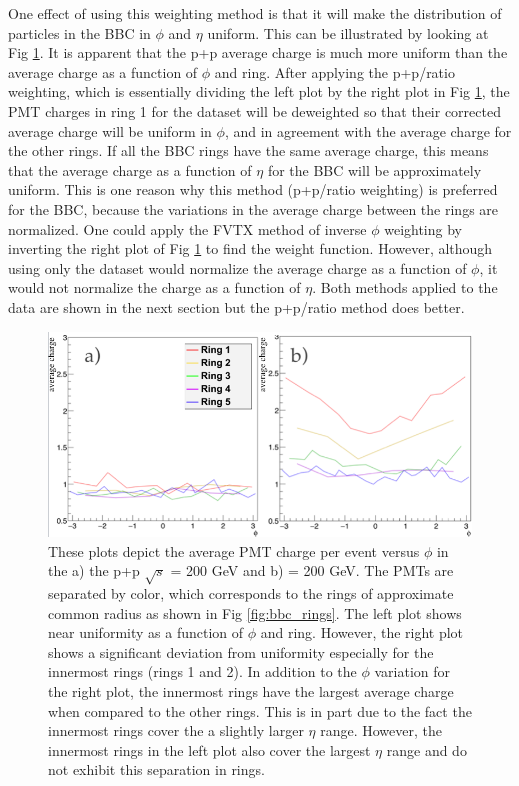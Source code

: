 One effect of using this weighting method is that it will make the distribution of particles in the BBC in $\phi$ and $\eta $ uniform. This can be illustrated by looking at Fig \ref{fig:bbc_pmt_phi_pp_pau}. It is apparent that the p+p average charge is much more uniform than the \pau average charge as a function of $\phi$ and ring. After applying the p+p/\pau ratio weighting, which is essentially dividing the left plot by the right plot in Fig \ref{fig:bbc_pmt_phi_pp_pau}, the PMT charges in ring 1 for the \pau dataset will be deweighted so that their corrected average charge will be uniform in $\phi$, and in agreement with the average charge for the other rings. If all the BBC rings have the same average charge, this means that the average charge as a function of $\eta$ for the BBC will be approximately uniform. This is one reason why this method (p+p/\pau ratio weighting) is preferred for the BBC, because the variations in the average charge between the rings are normalized. One could apply the FVTX method of inverse $\phi$ weighting by inverting the right plot of Fig \ref{fig:bbc_pmt_phi_pp_pau} to find the weight function. However, although using only the \pau dataset would normalize the average charge as a function of $\phi$, it would not normalize the charge as a function of $\eta$. Both methods applied to the data are shown in the next section but the p+p/\pau ratio method does better.

\begin{figure}[h!]
\begin{center}
\includegraphics[width=0.75\linewidth]{figs/pp_pau_bbc_comparison.png}
\caption{These plots depict the average PMT charge per event versus $\phi$ in the a) the p+p $\sqrt{s}$ = 200 GeV and b) \pau \sqsn = 200 GeV. The PMTs are separated by color, which corresponds to the rings of approximate common radius as shown in Fig \ref{fig:bbc_rings}. The left plot shows near uniformity as a function of $\phi$ and ring. However, the right plot shows a significant deviation from uniformity especially for the innermost rings (rings 1 and 2). In addition to the $\phi$ variation for the right plot, the innermost rings have the largest average charge when compared to the other rings. This is in part due to the fact the innermost rings cover the a slightly larger $\eta$ range. However, the innermost rings in the left plot also cover the largest $\eta$ range and do not exhibit this separation in rings. }
\label{fig:bbc_pmt_phi_pp_pau}
\end{center}
\end{figure}


